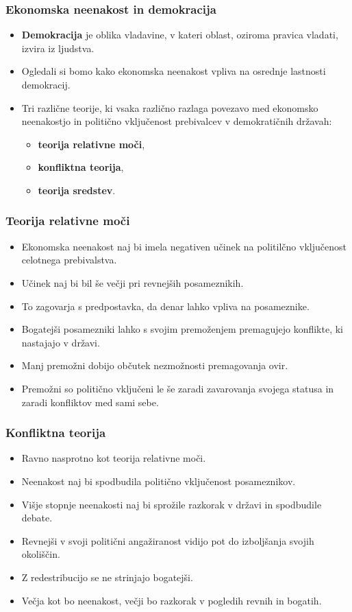 \documentclass[10pt]{beamer}
\begin{document}
\begin{frame}
\frametitle{Ekonomska neenakost in demokracija}
\begin{itemize}
\item \textbf{Demokracija} je oblika vladavine, v kateri oblast, oziroma pravica vladati, izvira iz ljudstva.
\item Ogledali si bomo kako ekonomska neenakost vpliva na osrednje lastnosti demokracij.
\item Tri različne teorije, ki vsaka različno razlaga povezavo med ekonomsko neenakostjo in politično vključenost prebivalcev v demokratičnih državah:
	\begin{itemize}
	\item \textbf{teorija relativne moči},
	\item \textbf{konfliktna teorija},
	\item \textbf{teorija sredstev}.
	\end{itemize}
\end{itemize}
\end{frame}

\begin{frame}
\frametitle{Teorija relativne moči}
\begin{itemize}
\item Ekonomska neenakost naj bi imela negativen učinek na politilčno vključenost celotnega prebivalstva.
\item Učinek naj bi bil še večji pri revnejših posameznikih.
\item To zagovarja s predpostavka, da denar lahko vpliva na posameznike.
\item Bogatejši posamezniki lahko s svojim premoženjem premagujejo konflikte, ki nastajajo v državi.
\item Manj premožni dobijo občutek nezmožnosti premagovanja ovir.
\item Premožni so politično vključeni le še zaradi zavarovanja svojega statusa in zaradi konfliktov med sami sebe.
\end{itemize}
\end{frame}

\begin{frame}
\frametitle{Konfliktna teorija}
\begin{itemize}
\item Ravno nasprotno kot teorija relativne moči.
\item Neenakost naj bi spodbudila politično vključenost posameznikov.
\item Višje stopnje neenakosti naj bi sprožile razkorak v državi in spodbudile debate.
\item Revnejši v svoji politični angažiranost vidijo pot do izboljšanja svojih okoliščin.
\item Z redestribucijo se ne strinjajo bogatejši.
\item Večja kot bo neenakost, večji bo razkorak v pogledih revnih in bogatih.
\end{itemize}
\end{frame}
\end{document}
